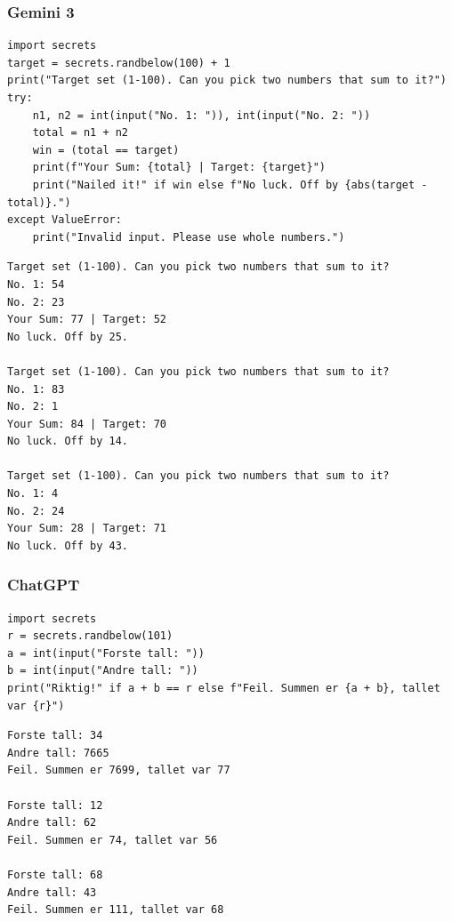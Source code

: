 \documentclass[12pt,a4paper]{article}
\begin{document}
\subsubsection*{Gemini 3}

\begin{lstlisting}[style=python, caption={Gemini 3 forkortet}]
import secrets
target = secrets.randbelow(100) + 1
print("Target set (1-100). Can you pick two numbers that sum to it?")
try:
    n1, n2 = int(input("No. 1: ")), int(input("No. 2: "))
    total = n1 + n2
    win = (total == target)
    print(f"Your Sum: {total} | Target: {target}")
    print("Nailed it!" if win else f"No luck. Off by {abs(target - total)}.")
except ValueError:
    print("Invalid input. Please use whole numbers.")
\end{lstlisting}

\begin{lstlisting}[style=terminal, caption={Output fra Gemini 3 forkortet}]
Target set (1-100). Can you pick two numbers that sum to it?
No. 1: 54
No. 2: 23
Your Sum: 77 | Target: 52
No luck. Off by 25.

Target set (1-100). Can you pick two numbers that sum to it?
No. 1: 83
No. 2: 1
Your Sum: 84 | Target: 70
No luck. Off by 14.

Target set (1-100). Can you pick two numbers that sum to it?
No. 1: 4
No. 2: 24
Your Sum: 28 | Target: 71
No luck. Off by 43.
\end{lstlisting}

\subsubsection*{ChatGPT}

\begin{lstlisting}[style=python, caption={ChatGPT forkortet}]
import secrets
r = secrets.randbelow(101)
a = int(input("Forste tall: "))
b = int(input("Andre tall: "))
print("Riktig!" if a + b == r else f"Feil. Summen er {a + b}, tallet var {r}")
\end{lstlisting}

\begin{lstlisting}[style=terminal, caption={Output fra ChatGPT forkortet}]
Forste tall: 34
Andre tall: 7665
Feil. Summen er 7699, tallet var 77

Forste tall: 12
Andre tall: 62
Feil. Summen er 74, tallet var 56

Forste tall: 68
Andre tall: 43
Feil. Summen er 111, tallet var 68
\end{lstlisting}
\end{document}
